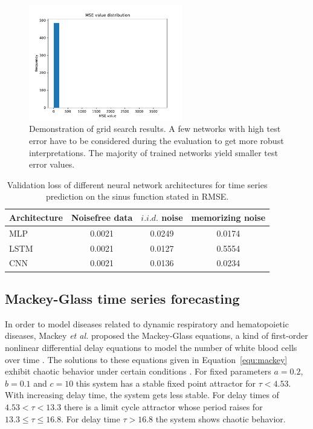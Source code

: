 \documentclass{article}
\begin{document}
\begin{figure}
    \centering
    \includegraphics[width=0.6\textwidth]{figures/histogram.pdf}
    \caption{Demonstration of grid search results. A few networks with high
    test error have to be considered during the evaluation to get more 
    robust interpretations. The majority of trained networks yield smaller
    test error values.}
    \label{fig:histogram}
\end{figure}

\begin{table}
    \centering
    \begin{tabular}{l|c|c|c}
        Architecture & Noisefree data & $i.i.d.$ noise & memorizing noise \\
        \hline
        MLP          & 0.0021         & 0.0249         & 0.0174           \\
        LSTM         & 0.0021         & 0.0127         & 0.5554           \\
        CNN          & 0.0021         & 0.0136         & 0.0234           \\
    \end{tabular}
    \caption{Validation loss of different neural network architectures for
        time series prediction on the sinus function stated
        in RMSE.}
    \label{tab:noise_finals}
\end{table}

\subsection{Mackey-Glass time series forecasting}

In order to model diseases related to dynamic respiratory and hematopoietic
diseases, Mackey \textit{et al.} proposed the Mackey-Glass equations, a kind of
first-order nonlinear differential delay equations to model
the number of white blood cells over time \cite{mackey1977}. The solutions to
these equations given in Equation~\ref{equ:mackey}
exhibit chaotic behavior under certain conditions \cite{farmer1982}. For fixed
parameters $a = 0.2$, $b=0.1$ and $c=10$ this system has a stable fixed point
attractor for $\tau < 4.53$. With increasing delay time, the system gets less
stable. For delay times of $4.53 < \tau < 13.3$ there is a limit cycle attractor
whose period raises for $13.3 \leq \tau \leq 16.8$. For delay time
$\tau > 16.8$ the system shows chaotic behavior.
\end{document}
